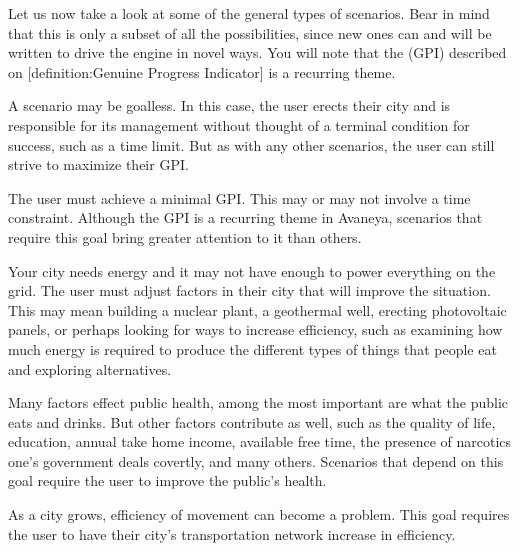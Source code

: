 Let us now take a look at some of the general types of scenarios. Bear in mind that this is only a subset of all the possibilities, since new ones can and will be written to drive the engine in novel ways. You will note that the  (GPI) described on [definition:Genuine Progress Indicator] is a recurring theme.

\startitemize[4]
\setupwhitespace[big]

A scenario may be goalless. In this case, the user erects their city and is responsible for its management without thought of a terminal condition for success, such as a time limit. But as with any other scenarios, the user can still strive to maximize their GPI.


The user must achieve a minimal GPI. This may or may not involve a time constraint. Although the GPI is a recurring theme in Avaneya, scenarios that require this goal bring greater attention to it than others.




Your city needs energy and it may not have enough to power everything on the grid. The user must adjust factors in their city that will improve the situation. This may mean building a nuclear plant, a geothermal well, erecting photovoltaic panels, or perhaps looking for ways to increase efficiency, such as examining how much energy is required to produce the different types of things that people eat and exploring alternatives.


Many factors effect public health, among the most important are what the public eats and drinks. But other factors contribute as well, such as the quality of life, education, annual take home income, available free time, the presence of narcotics one's government deals covertly, and many others. Scenarios that depend on this goal require the user to improve the public's health.


As a city grows, efficiency of movement can become a problem. This goal requires the user to have their city's transportation network increase in efficiency.

